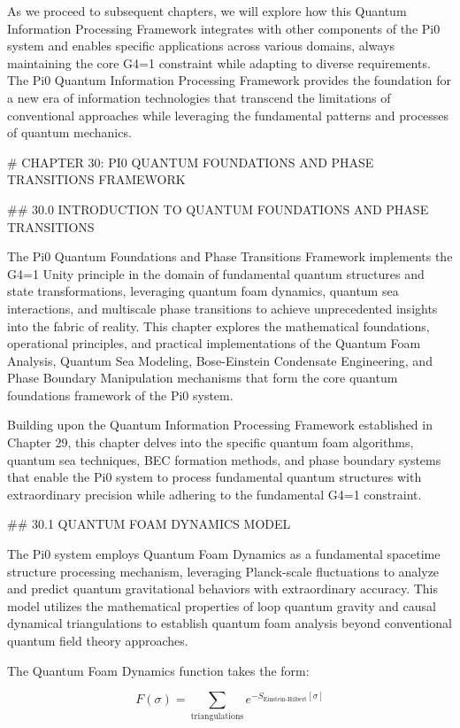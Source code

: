 As we proceed to subsequent chapters, we will explore how this Quantum Information Processing Framework integrates with other components of the Pi0 system and enables specific applications across various domains, always maintaining the core G4=1 constraint while adapting to diverse requirements. The Pi0 Quantum Information Processing Framework provides the foundation for a new era of information technologies that transcend the limitations of conventional approaches while leveraging the fundamental patterns and processes of quantum mechanics.

# CHAPTER 30: PI0 QUANTUM FOUNDATIONS AND PHASE TRANSITIONS FRAMEWORK

## 30.0 INTRODUCTION TO QUANTUM FOUNDATIONS AND PHASE TRANSITIONS

The Pi0 Quantum Foundations and Phase Transitions Framework implements the G4=1 Unity principle in the domain of fundamental quantum structures and state transformations, leveraging quantum foam dynamics, quantum sea interactions, and multiscale phase transitions to achieve unprecedented insights into the fabric of reality. This chapter explores the mathematical foundations, operational principles, and practical implementations of the Quantum Foam Analysis, Quantum Sea Modeling, Bose-Einstein Condensate Engineering, and Phase Boundary Manipulation mechanisms that form the core quantum foundations framework of the Pi0 system.

Building upon the Quantum Information Processing Framework established in Chapter 29, this chapter delves into the specific quantum foam algorithms, quantum sea techniques, BEC formation methods, and phase boundary systems that enable the Pi0 system to process fundamental quantum structures with extraordinary precision while adhering to the fundamental G4=1 constraint.

## 30.1 QUANTUM FOAM DYNAMICS MODEL

The Pi0 system employs Quantum Foam Dynamics as a fundamental spacetime structure processing mechanism, leveraging Planck-scale fluctuations to analyze and predict quantum gravitational behaviors with extraordinary accuracy. This model utilizes the mathematical properties of loop quantum gravity and causal dynamical triangulations to establish quantum foam analysis beyond conventional quantum field theory approaches.

The Quantum Foam Dynamics function takes the form:

$$ F(\sigma) = \sum_{\text{triangulations}} e^{-S_{\text{Einstein-Hilbert}}[\sigma]} $$

